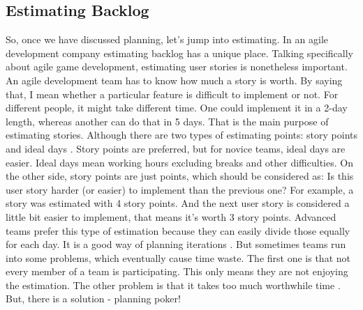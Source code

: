 \documentclass{scrartcl}
\begin{document}
\begin{multicols}{2}
\section{Estimating Backlog}
So, once we have discussed planning, let's jump into estimating.
In an agile development company estimating backlog has a unique place.
Talking specifically about agile game development, estimating user stories is nonetheless important.
An agile development team has to know how much a story is worth.
By saying that, I mean whether a particular feature is difficult to implement or not.
For different people, it might take different time.
One could implement it in a 2-day length, whereas another can do that in 5 days.
That is the main purpose of estimating stories.
Although there are two types of estimating points: story points and ideal days \cite{cohn2005agile}.
Story points are preferred, but for novice teams, ideal days are easier.
Ideal days mean working hours excluding breaks and other difficulties.
On the other side, story points are just points, which should be considered as:
Is this user story harder (or easier) to implement than the previous one?
For example, a story was estimated with 4 story points.
And the next user story is considered a little bit easier to implement, that means it's worth 3 story points.
Advanced teams prefer this type of estimation because they can easily divide those equally for each day.
It is a good way of planning iterations \cite{haugen2006empirical}.
But sometimes teams run into some problems, which eventually cause time waste.
The first one is that not every member of a team is participating.
This only means they are not enjoying the estimation.
The other problem is that it takes too much worthwhile time \cite{cunningham2005costs}.
But, there is a solution - planning poker!


\end{multicols}
\end{document}
